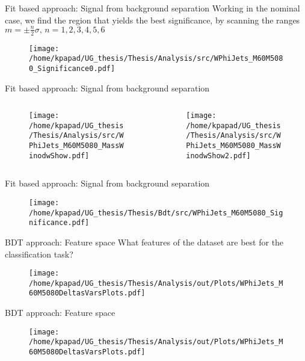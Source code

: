 \documentclass[bigger]{beamer}
\begin{document}
\begin{frame}[label={sec:orga298003}]{Fit based approach: Signal from background separation}
Working in the nominal case, we find the region that yields the best significance, by scanning the ranges \(m=\pm \frac{n}{2}\sigma\text{, }n=1, 2, 3, 4, 5, 6\) 
\begin{figure}[h]
\centering
\texttt{[image: /home/kpapad/UG\_thesis/Thesis/Analysis/src/WPhiJets\_M60M5080\_Significance0.pdf]}
\end{figure}
\end{frame}
\begin{frame}[label={sec:org031a32a}]{Fit based approach: Signal from background separation}
\begin{columns}
\begin{column}{0.5\columnwidth}
\begin{figure}[h]
\centering
\texttt{[image: /home/kpapad/UG\_thesis/Thesis/Analysis/src/WPhiJets\_M60M5080\_MassWinodwShow.pdf]}
\end{figure}
\end{column}
\begin{column}{0.5\columnwidth}
\begin{figure}[h]
\centering
\texttt{[image: /home/kpapad/UG\_thesis/Thesis/Analysis/src/WPhiJets\_M60M5080\_MassWinodwShow2.pdf]}
\end{figure}
\end{column}
\end{columns}
\end{frame}
\begin{frame}[label={sec:orgda0aa50}]{Fit based approach: Signal from background separation}
\begin{figure}[h]
\centering
\texttt{[image: /home/kpapad/UG\_thesis/Thesis/Bdt/src/WPhiJets\_M60M5080\_Significance.pdf]}
\end{figure}
\end{frame}
\begin{frame}[label={sec:org7f049f9}]{BDT approach: Feature space}
\alert{What features of the dataset are best for the classification task?}
\begin{figure}[h!]
\centering
\texttt{[image: /home/kpapad/UG\_thesis/Thesis/Analysis/out/Plots/WPhiJets\_M60M5080DeltasVarsPlots.pdf]}
\end{figure}
\end{frame}
\begin{frame}[label={sec:orgfbb88e2}]{BDT approach: Feature space}
\begin{figure}[h!]
\centering
\texttt{[image: /home/kpapad/UG\_thesis/Thesis/Analysis/out/Plots/WPhiJets\_M60M5080DeltasVarsPlots.pdf]}
\end{figure}
\end{frame}
\end{document}
